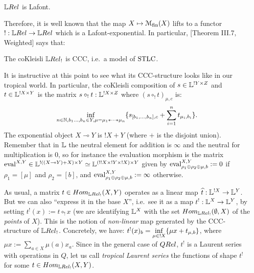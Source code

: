 \begin{fact}
 $\LREL$ is Lafont.
\end{fact}

Therefore, it is well known that the map $X\mapsto \mathcal{M}_{\mathrm{fin}}(X)$ lifts to a functor $!:\LREL\to\LREL$ which %
is a Lafont-exponential.
In particular, [Theorem III.7, Weighted] says that:
\begin{fact}
 The coKleisli $\LREL_!$ is CCC, i.e.\ a model of $\mathrm{STLC}$.
\end{fact}

It is instructive at this point to see what its CCC-structure looks like in our tropical world.
In particular, the coKleisli composition of $s\in\mathbb{L}^{!Y\times Z}$ and $t\in\mathbb{L}^{!X\times Y}$ is the matrix $s\circ_! t:\mathbb{L}^{!X\times Z}$ where $(s\circ_! t)_{\mu,c}$ is:
\[
 \inf\limits_{n\in\mathbb{N}, b_1\dots,b_n\in Y, \mu = \mu_1*\cdots *\mu_n}
 \{s_{[b_1,\dots,b_n],c} + \sum\limits_{i=1}^n t_{\mu_i,b_i}\}.
\]
The exponential object $X\multimap Y$ is $!X+Y$ (where $+$ is the disjoint union).
Remember that in $\mathbb{L}$ the neutral element for addition is $\infty$ and the neutral for multiplication is $0$, so for instance the evaluation morphism is the matrix $\mathrm{eval}^{X,Y}\in\mathbb{L}^{!((X\multimap Y) + X)\times Y}\simeq\mathbb{L}^{(!!X\times !Y\times !X)\times Y}$ given by $\mathrm{eval}^{X,Y}_{\rho_1\oplus\rho_2\oplus\mu,b}:=0$ if $\rho_1=[\mu]$ and $\rho_2=[b]$, and $\mathrm{eval}^{X,Y}_{\rho_1\oplus\rho_2\oplus\mu,b}:=\infty$ otherwise.

\begin{remark}
 As usual, a matrix $t\in\HOM{\LREL_!}{X}{Y}$ operates as a linear map $\widehat t:\mathbb{L}^{!X}\to\mathbb{L}^Y$.
 But we can also ``express it in the base $X$'', i.e.\ see it as a map $t^!:\mathbb{L}^X\to\mathbb{L}^Y$, by setting $t^!(x):=t\circ_! x$ (we are identifying $\mathbb{L}^X$ with the set $\HOM{\LREL_!}{\emptyset}{X}$ of the \emph{points} of $X$).
 This is the notion of \emph{non-linear} map generated by the CCC-structure of $\LREL_!$.
 Concretely, we have:
 $t^!(x)_b=\inf\limits_{\mu\in !X} \{\mu x+ t_{\mu,b}\}$, where $\mu x:=\sum\limits_{a\in X} \mu(a)x_a$.
 Since in the general case of $\QREL$, $t^!$ is a Laurent series with operations in $Q$, let us call \emph{tropical Laurent series} the functions of shape $t^!$ for some $t\in\HOM{\LREL_!}{X}{Y}$.
\end{remark}




